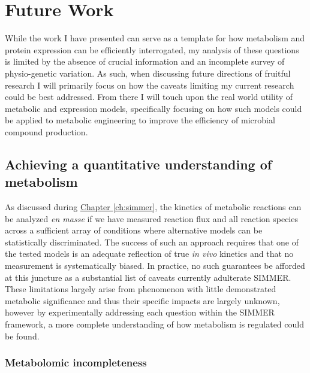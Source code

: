 \section{Future Work}

While the work I have presented can serve as a template for how metabolism and protein expression can be efficiently interrogated, my analysis of these questions is limited by the absence of crucial information and an incomplete survey of physio-genetic variation. As such, when discussing future directions of fruitful research I will primarily focus on how the caveats limiting my current research could be best addressed. From there I will touch upon the real world utility of metabolic and expression models, specifically focusing on how such models could be applied to metabolic engineering to improve the efficiency of microbial compound production.

\subsection{Achieving a quantitative understanding of metabolism}

As discussed during \hyperref[ch:simmer]{Chapter \ref{ch:simmer}}, the kinetics of metabolic reactions can be analyzed \textit{en masse} if we have measured reaction flux and all reaction species across a sufficient array of conditions where alternative models can be statistically discriminated. The success of such an approach requires that one of the tested models is an adequate reflection of true \textit{in vivo} kinetics and that no measurement is systematically biased. In practice, no such guarantees be afforded at this juncture as a substantial list of caveats currently adulterate SIMMER. These limitations largely arise from phenomenon with little demonstrated metabolic significance and thus their specific impacts are largely unknown, however by experimentally addressing each question within the SIMMER framework, a more complete understanding of how metabolism is regulated could be found.

\subsubsection{Metabolomic incompleteness}

